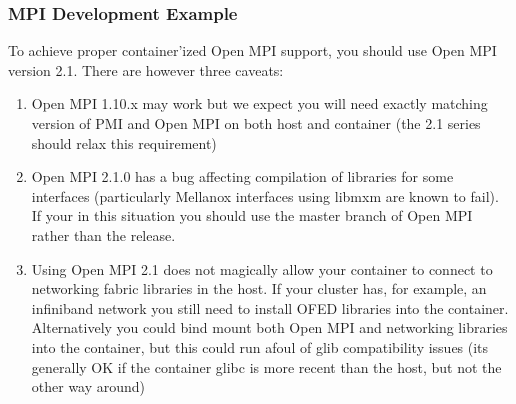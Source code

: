 \documentclass[letterpaper,10pt,english]{sphinxmanual}
\begin{document}
\subsubsection{MPI Development Example}
\label{\detokenize{installation_environments:mpi-development-example}}
 To achieve proper
container’ized Open MPI support, you should use Open MPI version 2.1.
There are however three caveats:
\begin{enumerate}
\item {} 
Open MPI 1.10.x may work but we expect you will need exactly matching
version of PMI and Open MPI on both host and container (the 2.1
series should relax this requirement)

\item {} 
Open MPI 2.1.0 has a bug affecting compilation of libraries for some
interfaces (particularly Mellanox interfaces using libmxm are known
to fail). If your in this situation you should use the master branch
of Open MPI rather than the release.

\item {} 
Using Open MPI 2.1 does not magically allow your container to connect
to networking fabric libraries in the host. If your cluster has, for
example, an infiniband network you still need to install OFED
libraries into the container. Alternatively you could bind mount both
Open MPI and networking libraries into the container, but this could
run afoul of glib compatibility issues (its generally OK if the
container glibc is more recent than the host, but not the other way
around)

\end{enumerate}
\end{document}
